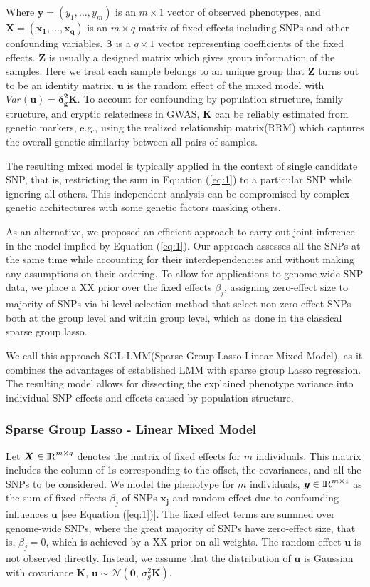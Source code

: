 \documentclass[11pt]{article}
\theoremstyle{plain}
\theoremstyle{definition}
\theoremstyle{remark}
\begin{document}
Where $\bm{y}=(y_1,\ldots,y_m)$ is an $m\times1$ vector of observed phenotypes, and $\bm{X}=(\bm{x_1},\ldots,\bm{x_q})$ is an $m\times q$ matrix of fixed effects including SNPs and other confounding variables. $\bm\beta$ is a $q\times1$ vector representing coefficients of the fixed effects. $\bm Z$ is usually a designed matrix which gives group information of the samples. Here we treat each sample belongs to an unique group that $\bm Z$ turns out to be an identity matrix. $\bm{u}$ is the random effect of the mixed model with $Var(\bm{u})=\bm{\delta_g^2K}$. To account for confounding by population structure, family structure, and cryptic relatedness in GWAS, $\bm{K}$ can be reliably estimated from genetic markers, e.g., using the realized relationship matrix(RRM) which captures the overall genetic similarity between all pairs of samples.

The resulting mixed model is typically applied in the context of single candidate SNP, that is, restricting the sum in Equation (\ref{eq:1}) to a particular SNP while ignoring all others. This independent analysis can be compromised by complex genetic architectures with some genetic factors masking others.

As an alternative, we proposed an efficient approach to carry out joint inference in the model implied by Equation (\ref{eq:1}). Our approach assesses all the SNPs at the same time while accounting for their interdependencies and without making any assumptions on their ordering. To allow for applications to genome-wide SNP data, we place a XX prior over the fixed effects $\beta_j$, assigning zero-effect size to majority of SNPs via bi-level selection method that select non-zero effect SNPs both at the group level and within group level, which as done in the classical sparse group lasso.

We call this approach SGL-LMM(Sparse Group Lasso-Linear Mixed Model), as it combines the advantages of established LMM with sparse group Lasso regression. The resulting model allows for dissecting the explained phenotype variance into individual SNP effects and effects caused by population structure.

\subsubsection{Sparse Group Lasso - Linear Mixed Model}
Let $\bm{X}\in{\rm I\!R}^{m \times q}$ denotes the matrix of fixed effects for $m$ individuals. This matrix includes the column of 1s corresponding to the offset, the covariances, and all the SNPs to be considered. We model the phenotype for $m$ individuals, $\bm{y}\in {\rm I\!R}^{m\times1}$ as the sum of fixed effects $\beta_j$ of SNPs $\bm{x_j}$ and random effect due to confounding influences $\bm{u}$ [see Equation (\ref{eq:1})]. The fixed effect terms are summed over genome-wide SNPs, where the great majority of SNPs have zero-effect size, that is, $\beta_j=0$, which is achieved by a XX prior on all weights. The random effect $\bm{u}$ is not observed directly. Instead, we assume that the distribution of $\bm{u}$ is Gaussian with covariance $\bm{K}$, $\bm{u}\sim \mathcal{N}(\bm{0},\,\sigma_g^2\bm{K})$.
\end{document}
